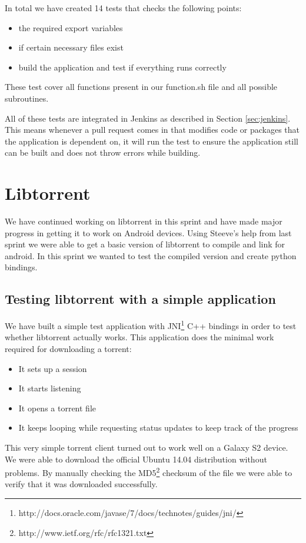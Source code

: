 		In total we have created 14 tests that checks the following points:
		
		\begin{itemize}
			\item the required export variables
			\item if certain necessary files exist
			\item build the application and test if everything runs correctly
		\end{itemize}
		
		These test cover all functions present in our function.sh file and all possible subroutines. 
		
		All of these tests are integrated in Jenkins as described in Section \ref{sec:jenkins}. This means whenever a pull request comes in that modifies code or packages that the application is dependent on, it will run the test to ensure the application still can be built and does not throw errors while building.
	
	\section{Libtorrent}
		We have continued working on libtorrent in this sprint and have made major progress in getting it to work on Android devices. Using Steeve's help from last sprint we were able to get a basic version of libtorrent to compile and link for android. In this sprint we wanted to test the compiled version and create python bindings.
		
		\subsection{Testing libtorrent with a simple application}
			We have built a simple test application with JNI\footnote{http://docs.oracle.com/javase/7/docs/technotes/guides/jni/} C++ bindings in order to test whether libtorrent actually works. This application does the minimal work required for downloading a torrent:
			\begin{itemize}
				\item It sets up a session
				\item It starts listening
				\item It opens a torrent file
				\item It keeps looping while requesting status updates to keep track of the progress
			\end{itemize}
			This very simple torrent client turned out to work well on a Galaxy S2 device. We were able to download the official Ubuntu 14.04 distribution without problems. By manually checking the MD5\footnote{http://www.ietf.org/rfc/rfc1321.txt} checksum of the file we were able to verify that it was downloaded successfully.
		
